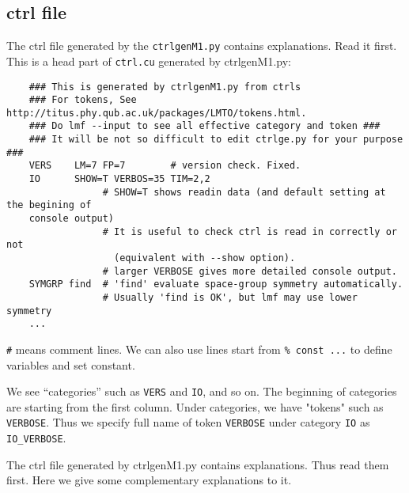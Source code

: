 \documentclass[a4paper,10pt,epsf,fleqn]{article}
\begin{document}
\subsection{ctrl file}
The ctrl file generated by the \verb+ctrlgenM1.py+ contains explanations. 
Read it first. This is a head part of \verb+ctrl.cu+ generated by ctrlgenM1.py:
\begin{verbatim}
    ### This is generated by ctrlgenM1.py from ctrls 
    ### For tokens, See http://titus.phy.qub.ac.uk/packages/LMTO/tokens.html. 
    ### Do lmf --input to see all effective category and token ###
    ### It will be not so difficult to edit ctrlge.py for your purpose ###
    VERS    LM=7 FP=7        # version check. Fixed.
    IO      SHOW=T VERBOS=35 TIM=2,2
                 # SHOW=T shows readin data (and default setting at the begining of 
    console output)
                 # It is useful to check ctrl is read in correctly or not
                   (equivalent with --show option).
                 # larger VERBOSE gives more detailed console output.
    SYMGRP find  # 'find' evaluate space-group symmetry automatically.
                 # Usually 'find is OK', but lmf may use lower symmetry
    ...
\end{verbatim}
\verb+#+ means comment lines. We can also use
lines start from \verb+% const ...+ to define variables and set constant.

We see ``categories'' such as \verb+VERS+ and \verb+IO+, and so on.
The beginning of categories are starting from the first column.
Under categories, we have "tokens" such as \verb+VERBOSE+.
Thus we specify full name of token \verb+VERBOSE+ under category
\verb+IO+ as \verb+IO_VERBOSE+.

The ctrl file generated by ctrlgenM1.py contains explanations.
Thus read them first. Here we give some complementary explanations to it.
\end{document}
